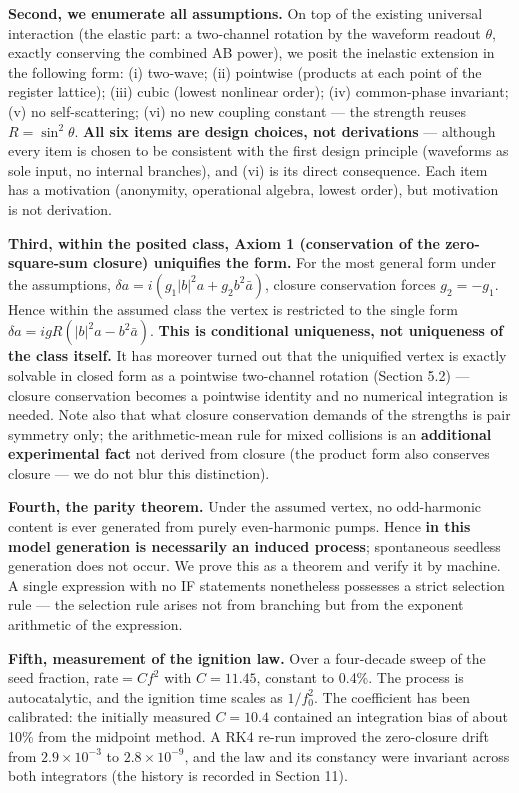 \documentclass[
  a4paper,
]{article}
\newcounter{none} %
\begin{document}
\textbf{Second, we enumerate all assumptions.} On top of the existing
universal interaction (the elastic part: a two-channel rotation by the
waveform readout \(\theta\), exactly conserving the combined AB power),
we posit the inelastic extension in the following form: (i) two-wave;
(ii) pointwise (products at each point of the register lattice); (iii)
cubic (lowest nonlinear order); (iv) common-phase invariant; (v) no
self-scattering; (vi) no new coupling constant --- the strength reuses
\(R=\sin^2\theta\). \textbf{All six items are design choices, not
derivations} --- although every item is chosen to be consistent with the
first design principle (waveforms as sole input, no internal branches),
and (vi) is its direct consequence. Each item has a motivation
(anonymity, operational algebra, lowest order), but motivation is not
derivation.

\textbf{Third, within the posited class, Axiom 1 (conservation of the
zero-square-sum closure) uniquifies the form.} For the most general form
under the assumptions, \(\delta a = i(g_1|b|^2 a + g_2 b^2\bar a)\),
closure conservation forces \(g_2=-g_1\). Hence within the assumed class
the vertex is restricted to the single form
\(\delta a = igR(|b|^2 a - b^2\bar a)\). \textbf{This is conditional
uniqueness, not uniqueness of the class itself.} It has moreover turned
out that the uniquified vertex is exactly solvable in closed form as a
pointwise two-channel rotation (Section 5.2) --- closure conservation
becomes a pointwise identity and no numerical integration is needed.
Note also that what closure conservation demands of the strengths is
pair symmetry only; the arithmetic-mean rule for mixed collisions is an
\textbf{additional experimental fact} not derived from closure (the
product form also conserves closure --- we do not blur this
distinction).

\textbf{Fourth, the parity theorem.} Under the assumed vertex, no
odd-harmonic content is ever generated from purely even-harmonic pumps.
Hence \textbf{in this model generation is necessarily an induced
process}; spontaneous seedless generation does not occur. We prove this
as a theorem and verify it by machine. A single expression with no IF
statements nonetheless possesses a strict selection rule --- the
selection rule arises not from branching but from the exponent
arithmetic of the expression.

\textbf{Fifth, measurement of the ignition law.} Over a four-decade
sweep of the seed fraction, \(\mathrm{rate} = C f^2\) with
\(C = 11.45\), constant to 0.4\%. The process is autocatalytic, and the
ignition time scales as \(1/f_0^2\). The coefficient has been
calibrated: the initially measured \(C=10.4\) contained an integration
bias of about 10\% from the midpoint method. A RK4 re-run improved the
zero-closure drift from \(2.9\times10^{-3}\) to \(2.8\times10^{-9}\),
and the law and its constancy were invariant across both integrators
(the history is recorded in Section 11).
\end{document}
